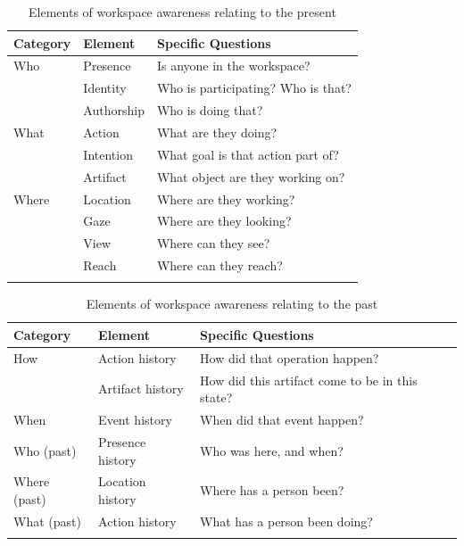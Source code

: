\begin{table}[!h]

      \centering
        \caption{Elements of workspace awareness relating to the present}
        \begin{tabularx}{\textwidth}{lll}
        \toprule
        Category & Element & Specific Questions\\
        \midrule
        Who & Presence & Is anyone in the workspace?\\
         & Identity & Who is participating? Who is that?\\
        \vspace{0.2cm}
         & Authorship & Who is doing that?\\
        
        What & Action & What are they doing?\\
         & Intention & What goal is that action part of?\\
        \vspace{0.2cm}
         & Artifact & What object are they working on?\\
        
        Where & Location & Where are they working?\\
         & Gaze & Where are they looking?\\
         & View & Where can they see?\\
         & Reach & Where can they reach?\\
        
        \bottomrule
        \label{table:awarenessPresent}
        \end{tabularx}
\end{table}

\begin{table}[!h]
      \centering
        \caption{Elements of workspace awareness relating to the past}
        \begin{tabularx}{\textwidth}{lll}
        \toprule
        Category & Element & Specific Questions\\
        \midrule
        How & Action history & How did that operation happen?\\
        \vspace{0.2cm}
         & Artifact history & How did this artifact come to be in this state?\\\vspace{0.2cm}
        When & Event history & When did that event happen?\\\vspace{0.2cm}
        Who (past) & Presence history & Who was here, and when?\\\vspace{0.2cm}
        Where (past) & Location history & Where has a person been?\\\vspace{0.2cm}
        What (past) & Action history & What has a person been doing?\\
        \bottomrule
        \label{table:awarenessPast}
        \end{tabularx}
\end{table}

